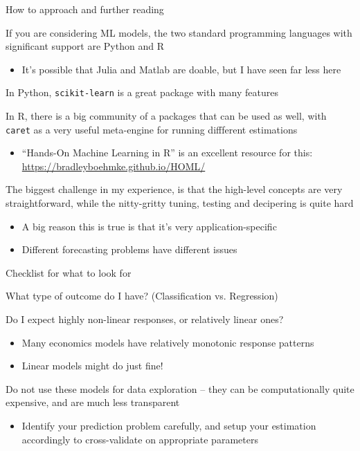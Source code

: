 \documentclass[notes,11pt, aspectratio=169]{beamer}
\newenvironment{wideitemize}{\itemize\addtolength{\itemsep}{10pt}}{\enditemize}
\begin{document}
\begin{frame}{How to approach and further reading}
  \begin{wideitemize}
  \item If you are considering ML models, the two standard programming
    languages with significant support are Python and R
    \begin{itemize}
    \item It's possible that Julia and Matlab are doable, but I have seen far less here
    \end{itemize}
  \item In Python, \texttt{scikit-learn} is a great package with many features
  \item In R, there is a big community of a packages that can be used
    as well, with \texttt{caret} as a very useful meta-engine for
    running diffferent estimations
    \begin{itemize}
    \item ``Hands-On Machine Learning in R'' is an excellent resource
      for this: \url{https://bradleyboehmke.github.io/HOML/}
    \end{itemize}
  \item The biggest challenge in my experience, is that the high-level
    concepts are very straightforward, while the nitty-gritty tuning,
    testing and decipering is quite hard
    \begin{itemize}
    \item A big reason this is true is that it's very application-specific
    \item Different forecasting problems have different issues
    \end{itemize}
  \end{wideitemize}
\end{frame}

\begin{frame}{Checklist for what to look for}
  \begin{wideitemize}
  \item What type of outcome do I have? (Classification vs. Regression)
  \item Do I expect highly non-linear responses, or relatively linear ones?
    \begin{itemize}
    \item Many economics models have relatively monotonic response patterns
    \item Linear models might do just fine!
    \end{itemize}
  \item Do not use these models for data exploration -- they can be
    computationally quite expensive, and are much less transparent
    \begin{itemize}
    \item Identify your prediction problem carefully, and setup your
      estimation accordingly to cross-validate on appropriate
      parameters
    \end{itemize}
  \end{wideitemize}
\end{frame}
\end{document}
